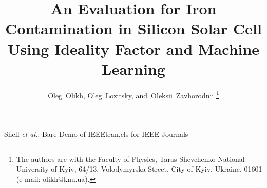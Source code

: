 \documentclass[journal]{IEEEtran}
\begin{document}
%
\title{An Evaluation for Iron Contamination in Silicon Solar Cell Using Ideality Factor and Machine Learning}
%
%
%

\author{Oleg~Olikh,
        Oleg~Lozitsky,
        and~Oleksii~Zavhorodnii%
\thanks{The authors are with the Faculty of Physics, Taras Shevchenko National University of Kyiv, 64/13, Volodymyrska Street, City of Kyiv, Ukraine, 01601 (e-mail: olikh@knu.ua).}}

%
%



%
{Shell \MakeLowercase{\textit{et al.}}: Bare Demo of IEEEtran.cls for IEEE Journals}
%
\end{document}
